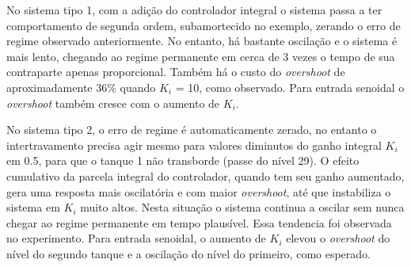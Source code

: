 

No sistema tipo 1, com a adição do controlador integral o sistema passa a ter comportamento de segunda ordem, subamortecido no exemplo, zerando o erro de regime observado anteriormente. No entanto, há bastante oscilação e o sistema é mais lento, chegando ao regime permanente em cerca de 3 vezes o tempo de sua contraparte apenas proporcional. Também há o custo do \emph{overshoot} de aproximadamente 36\% quando $K_i$ = 10, como observado. Para entrada senoidal o \emph{overshoot} também cresce com o aumento de $K_i$.

No sistema tipo 2, o erro de regime é automaticamente zerado, no entanto o intertravamento precisa agir mesmo para valores diminutos do ganho integral $K_i$ em 0.5, para que o tanque 1 não transborde (passe do nível 29). O efeito cumulativo da parcela integral do controlador, quando tem seu ganho aumentado, gera uma resposta mais oscilatória e com maior \emph{overshoot}, até que instabiliza o sistema em $K_i$ muito altos. Nesta situação o sistema continua a oscilar sem nunca chegar ao regime permanente em tempo plausível. Essa tendencia foi observada no experimento. Para entrada senoidal, o aumento de $K_i$ elevou o \emph{overshoot} do nível do segundo tanque e a oscilação do nível do primeiro, como esperado.
